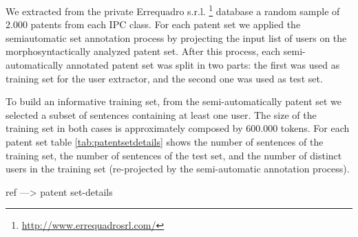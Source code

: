 \documentclass[]{book}
\let\rmarkdownfootnote\footnote%
\def\footnote{\protect\rmarkdownfootnote}
\theoremstyle{definition}
\theoremstyle{definition}
\theoremstyle{definition}
\theoremstyle{remark}
\begin{document}
We extracted from the private Errequadro s.r.l. \footnote{\url{http://www.errequadrosrl.com/}}
database a random sample of 2.000 patents from each IPC class. For each
patent set we applied the semiautomatic set annotation process by
projecting the input list of users on the morphosyntactically analyzed
patent set. After this process, each semi-automatically annotated patent
set was split in two parts: the first was used as training set for the
user extractor, and the second one was used as test set.

To build an informative training set, from the semi-automatically patent
set we selected a subset of sentences containing at least one user. The
size of the training set in both cases is approximately composed by
600.000 tokens. For each patent set table \ref{tab:patentsetdetails}
shows the number of sentences of the training set, the number of
sentences of the test set, and the number of distinct users in the
training set (re-projected by the semi-automatic annotation process).

ref ---\textgreater{} patent set-details
\end{document}
